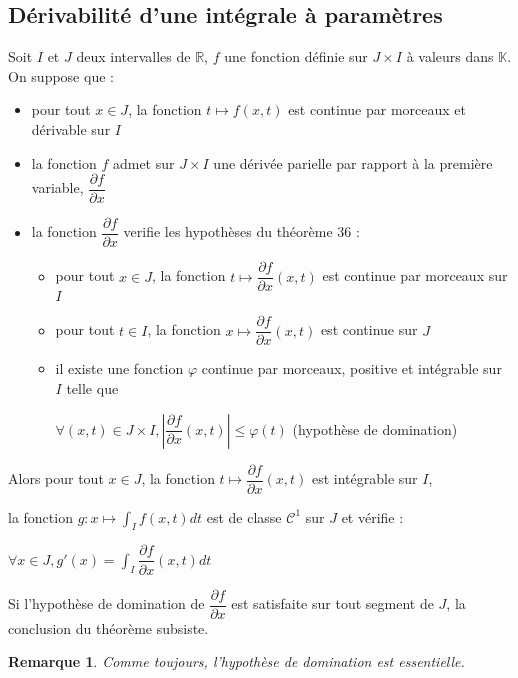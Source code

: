 \documentclass[a4paper,12pt]{book}
\newcommand{\Thr}[2]{\begin{tcolorbox}[sharp corners, colback=white,colframe=red!90!black!75, title=Théorème : #1]#2\end{tcolorbox}}
\newcommand{\Prop}[2]{\begin{tcolorbox}[sharp corners, colback=white,colframe=red!90!black!75, title=Proposition : #1]#2\end{tcolorbox}}
\newtheorem{Rem}{Remarque}[section]
\def\R{\mathbb{R}}
\def\K{\mathbb{K}}
\begin{document}
\subsection{Dérivabilité d'une intégrale à paramètres}
\Thr{Dérivabilité}{Soit $I$ et $J$ deux intervalles de $\R$, $f$ une fonction définie sur $J\times I$ à valeurs dans $\K$. On suppose que :\begin{itemize}
\item pour tout $x\in J$, la fonction $t\mapsto f(x,t)$ est continue par morceaux et dérivable sur $I$
\item la fonction $f$ admet sur $J\times I$ une dérivée parielle par rapport à la première variable, $\dfrac{\partial f}{\partial x}$
\item la fonction $\dfrac{\partial f}{\partial x}$ verifie les hypothèses du théorème 36 :\begin{itemize}
    \item pour tout $x\in J$, la fonction $t\mapsto \dfrac{\partial f}{\partial x}(x,t)$ est continue par morceaux sur $I$
    \item pour tout $t\in I$, la fonction $x\mapsto \dfrac{\partial f}{\partial x}(x,t)$ est continue sur $J$
    \item il existe une fonction $\varphi$ continue par morceaux, positive et intégrable sur $I$ telle que \par \begin{center}$\forall (x,t)\in J\times I, \left\vert\dfrac{\partial f}{\partial x}(x,t)\right\vert\leq\varphi(t)$ (hypothèse de domination) \end{center}
\end{itemize}
\end{itemize}
Alors pour tout $x\in J$, la fonction $t\mapsto \dfrac{\partial f}{\partial x}(x,t)$ est intégrable sur $I$, \par la fonction $g:x\mapsto \int_If(x,t)dt$ est de classe $\mathcal{C}^1$ sur $J$ et vérifie : \par\begin{center}$\forall x\in J, g'(x)=\int_I\dfrac{\partial f}{\partial x}(x,t)dt$\end{center}}
\Prop{Extension}{Si l'hypothèse de domination de $\dfrac{\partial f}{\partial x}$ est satisfaite sur tout segment de $J$, la conclusion du théorème subsiste.}
\begin{Rem}
Comme toujours, l'hypothèse de domination est essentielle.
\end{Rem}
\end{document}
